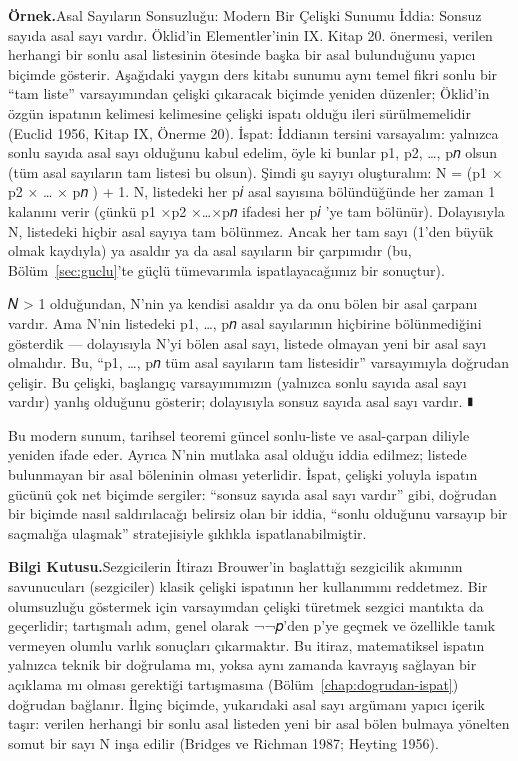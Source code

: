 \begin{tcolorbox}[bookbox,colback=cEx]\textbf{\textsf{\textcolor{cAcc}{Örnek.}}}\quad Asal Sayıların Sonsuzluğu: Modern Bir Çelişki Sunumu İddia: Sonsuz sayıda asal sayı vardır. Öklid’in Elementler’inin IX. Kitap 20. önermesi, verilen herhangi bir sonlu asal listesinin ötesinde başka bir asal bulunduğunu yapıcı biçimde gösterir. Aşağıdaki yaygın ders kitabı sunumu aynı temel fikri sonlu bir “tam liste” varsayımından çelişki çıkaracak biçimde yeniden düzenler; Öklid’in özgün ispatının kelimesi kelimesine çelişki ispatı olduğu ileri sürülmemelidir (Euclid 1956, Kitap IX, Önerme 20). İspat: İddianın tersini varsayalım: yalnızca sonlu sayıda asal sayı olduğunu kabul edelim, öyle ki bunlar p1, p2, …, p𝑛 olsun (tüm asal sayıların tam listesi bu olsun). Şimdi şu sayıyı oluşturalım: N = (p1 × p2 × … × p𝑛 ) + 1. N, listedeki her p𝑖 asal sayısına bölündüğünde her zaman 1 kalanını verir (çünkü p1 ×p2 ×…×p𝑛 ifadesi her p𝑖 ’ye tam bölünür). Dolayısıyla N, listedeki hiçbir asal sayıya tam bölünmez. Ancak her tam sayı (1’den büyük olmak kaydıyla) ya asaldır ya da asal sayıların bir çarpımıdır (bu, Bölüm~\ref{sec:guclu}’te güçlü tümevarımla ispatlayacağımız bir sonuçtur).\end{tcolorbox}

𝑁 > 1 olduğundan, N’nin ya kendisi asaldır ya da onu bölen bir asal çarpanı vardır. Ama N’nin listedeki p1, …, p𝑛 asal sayılarının hiçbirine bölünmediğini gösterdik — dolayısıyla N’yi bölen asal sayı, listede olmayan yeni bir asal sayı olmalıdır. Bu, “p1, …, p𝑛 tüm asal sayıların tam listesidir” varsayımıyla doğrudan çelişir. Bu çelişki, başlangıç varsayımımızın (yalnızca sonlu sayıda asal sayı vardır) yanlış olduğunu gösterir; dolayısıyla sonsuz sayıda asal sayı vardır. ∎

Bu modern sunum, tarihsel teoremi güncel sonlu-liste ve asal-çarpan diliyle yeniden ifade eder. Ayrıca N’nin mutlaka asal olduğu iddia edilmez; listede bulunmayan bir asal böleninin olması yeterlidir. İspat, çelişki yoluyla ispatın gücünü çok net biçimde sergiler: “sonsuz sayıda asal sayı vardır” gibi, doğrudan bir biçimde nasıl saldırılacağı belirsiz olan bir iddia, “sonlu olduğunu varsayıp bir saçmalığa ulaşmak” stratejisiyle şıklıkla ispatlanabilmiştir.

\begin{tcolorbox}[bookbox,colback=cEx]\textbf{\textsf{\textcolor{cAcc}{Bilgi Kutusu.}}}\quad Sezgicilerin İtirazı Brouwer’in başlattığı sezgicilik akımının savunucuları (sezgiciler) klasik çelişki ispatının her kullanımını reddetmez. Bir olumsuzluğu göstermek için varsayımdan çelişki türetmek sezgici mantıkta da geçerlidir; tartışmalı adım, genel olarak ¬¬𝑝’den p’ye geçmek ve özellikle tanık vermeyen olumlu varlık sonuçları çıkarmaktır. Bu itiraz, matematiksel ispatın yalnızca teknik bir doğrulama mı, yoksa aynı zamanda kavrayış sağlayan bir açıklama mı olması gerektiği tartışmasına (Bölüm~\ref{chap:dogrudan-ispat}) doğrudan bağlanır. İlginç biçimde, yukarıdaki asal sayı argümanı yapıcı içerik taşır: verilen herhangi bir sonlu asal listeden yeni bir asal bölen bulmaya yönelten somut bir sayı N inşa edilir (Bridges ve Richman 1987; Heyting 1956).\end{tcolorbox}


